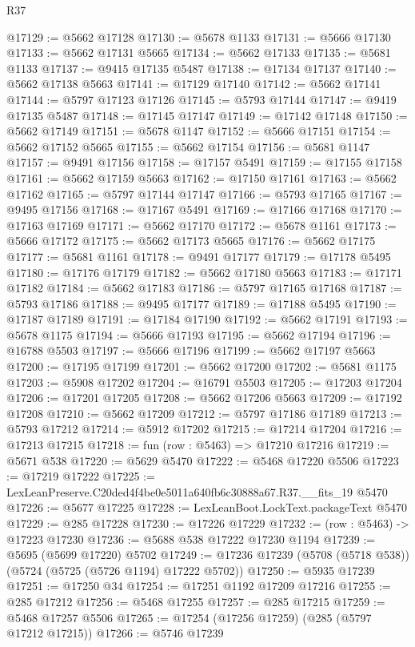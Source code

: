\begin{lexlean}{R37}
\begin{coremodule}
@17129 := @5662 @17128
@17130 := @5678 @1133
@17131 := @5666 @17130
@17133 := @5662 @17131 @5665
@17134 := @5662 @17133
@17135 := @5681 @1133
@17137 := @9415 @17135 @5487
@17138 := @17134 @17137
@17140 := @5662 @17138 @5663
@17141 := @17129 @17140
@17142 := @5662 @17141
@17144 := @5797 @17123 @17126
@17145 := @5793 @17144
@17147 := @9419 @17135 @5487
@17148 := @17145 @17147
@17149 := @17142 @17148
@17150 := @5662 @17149
@17151 := @5678 @1147
@17152 := @5666 @17151
@17154 := @5662 @17152 @5665
@17155 := @5662 @17154
@17156 := @5681 @1147
@17157 := @9491 @17156
@17158 := @17157 @5491
@17159 := @17155 @17158
@17161 := @5662 @17159 @5663
@17162 := @17150 @17161
@17163 := @5662 @17162
@17165 := @5797 @17144 @17147
@17166 := @5793 @17165
@17167 := @9495 @17156
@17168 := @17167 @5491
@17169 := @17166 @17168
@17170 := @17163 @17169
@17171 := @5662 @17170
@17172 := @5678 @1161
@17173 := @5666 @17172
@17175 := @5662 @17173 @5665
@17176 := @5662 @17175
@17177 := @5681 @1161
@17178 := @9491 @17177
@17179 := @17178 @5495
@17180 := @17176 @17179
@17182 := @5662 @17180 @5663
@17183 := @17171 @17182
@17184 := @5662 @17183
@17186 := @5797 @17165 @17168
@17187 := @5793 @17186
@17188 := @9495 @17177
@17189 := @17188 @5495
@17190 := @17187 @17189
@17191 := @17184 @17190
@17192 := @5662 @17191
@17193 := @5678 @1175
@17194 := @5666 @17193
@17195 := @5662 @17194
@17196 := @16788 @5503
@17197 := @5666 @17196
@17199 := @5662 @17197 @5663
@17200 := @17195 @17199
@17201 := @5662 @17200
@17202 := @5681 @1175
@17203 := @5908 @17202
@17204 := @16791 @5503
@17205 := @17203 @17204
@17206 := @17201 @17205
@17208 := @5662 @17206 @5663
@17209 := @17192 @17208
@17210 := @5662 @17209
@17212 := @5797 @17186 @17189
@17213 := @5793 @17212
@17214 := @5912 @17202
@17215 := @17214 @17204
@17216 := @17213 @17215
@17218 := fun (row : @5463) => @17210 @17216
@17219 := @5671 @538
@17220 := @5629 @5470
@17222 := @5468 @17220 @5506
@17223 := @17219 @17222
@17225 := LexLeanPreserve.C20ded4f4be0e5011a640fb6c30888a67.R37.__fits_19 @5470
@17226 := @5677 @17225
@17228 := LexLeanBoot.LockText.packageText @5470
@17229 := @285 @17228
@17230 := @17226 @17229
@17232 := (row : @5463) -> @17223 @17230
@17236 := @5688 @538 @17222 @17230 @1194
@17239 := @5695 (@5699 @17220) @5702
@17249 := @17236 @17239 (@5708 (@5718 @538)) (@5724 (@5725 (@5726 @1194) @17222 @5702))
@17250 := @5935 @17239
@17251 := @17250 @34
@17254 := @17251 @1192 @17209 @17216
@17255 := @285 @17212
@17256 := @5468 @17255
@17257 := @285 @17215
@17259 := @5468 @17257 @5506
@17265 := @17254 (@17256 @17259) (@285 (@5797 @17212 @17215))
@17266 := @5746 @17239

\end{coremodule}
\end{lexlean}
